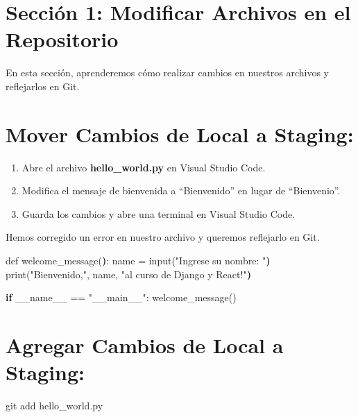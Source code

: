 \documentclass[
  a4paper,
  DIV=11,
  numbers=noendperiod,
  onepage,
  openany]{scrreprt}
\newenvironment{Shaded}{\begin{snugshade}}{\end{snugshade}}
\newcommand{\BuiltInTok}[1]{\textcolor[rgb]{0.00,0.23,0.31}{#1}}
\newcommand{\ControlFlowTok}[1]{\textcolor[rgb]{0.00,0.23,0.31}{\textbf{#1}}}
\newcommand{\ErrorTok}[1]{\textcolor[rgb]{0.68,0.00,0.00}{#1}}
\newcommand{\ExtensionTok}[1]{\textcolor[rgb]{0.00,0.23,0.31}{#1}}
\newcommand{\FunctionTok}[1]{\textcolor[rgb]{0.28,0.35,0.67}{#1}}
\newcommand{\KeywordTok}[1]{\textcolor[rgb]{0.00,0.23,0.31}{\textbf{#1}}}
\newcommand{\NormalTok}[1]{\textcolor[rgb]{0.00,0.23,0.31}{#1}}
\newcommand{\StringTok}[1]{\textcolor[rgb]{0.13,0.47,0.30}{#1}}
\providecommand{\tightlist}{%
  \setlength{\itemsep}{0pt}\setlength{\parskip}{0pt}}\usepackage{longtable,booktabs,array}
\begin{document}
\section{Sección 1: Modificar Archivos en el
Repositorio}\label{secciuxf3n-1-modificar-archivos-en-el-repositorio}

En esta sección, aprenderemos cómo realizar cambios en nuestros archivos
y reflejarlos en Git.

\section{Mover Cambios de Local a
Staging:}\label{mover-cambios-de-local-a-staging}

\begin{enumerate}
\def\labelenumi{\arabic{enumi}.}
\tightlist
\item
  Abre el archivo \textbf{hello\_world.py} en Visual Studio Code.
\item
  Modifica el mensaje de bienvenida a ``Bienvenido'' en lugar de
  ``Bienvenio''.
\item
  Guarda los cambios y abre una terminal en Visual Studio Code.
\end{enumerate}

Hemos corregido un error en nuestro archivo y queremos reflejarlo en
Git.

\begin{Shaded}
\begin{Highlighting}[]
\ExtensionTok{def}\NormalTok{ welcome\_message}\ErrorTok{(}\KeywordTok{)}\BuiltInTok{:}
    \ExtensionTok{name}\NormalTok{ = input}\ErrorTok{(}\StringTok{"Ingrese su nombre: "}\KeywordTok{)}
    \ExtensionTok{print}\ErrorTok{(}\StringTok{"Bienvenido,"}\ExtensionTok{,}\NormalTok{ name, }\StringTok{"al curso de Django y React!"}\KeywordTok{)}

\ControlFlowTok{if} \ExtensionTok{\_\_name\_\_}\NormalTok{ == }\StringTok{"\_\_main\_\_"}\NormalTok{:}
    \FunctionTok{welcome\_message()}
\end{Highlighting}
\end{Shaded}

\section{Agregar Cambios de Local a
Staging:}\label{agregar-cambios-de-local-a-staging}

\begin{Shaded}
\begin{Highlighting}[]
\FunctionTok{git}\NormalTok{ add hello\_world.py}
\end{Highlighting}
\end{Shaded}
\end{document}
